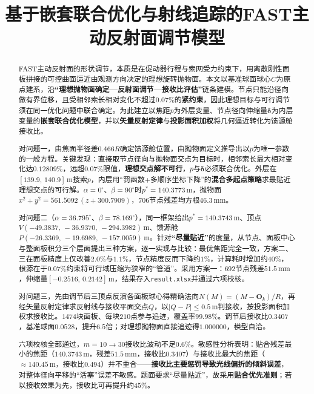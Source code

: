 \documentclass[withoutpreface]{cumcmthesis}
\title{基于嵌套联合优化与射线追踪的FAST主动反射面调节模型}
\begin{document}
\maketitle

\begin{abstract}
FAST主动反射面的形状调节，本质是在促动器行程与索网受力约束下，用离散刚性面板拼接的可控曲面逼近由观测方向决定的理想旋转抛物面。本文以基准球面球心$C$为原点建系，沿\textbf{``理想抛物面确定—反射面调节—接收比评估''}链条建模。节点只能沿径向做有界位移，且受相邻索长相对变化不超过$0.07\%$的\textbf{紧约束}，因此理想目标与可行调节须在同一优化问题中联合确定。为此建立以焦距$p$为外层变量、节点径向伸缩量$\boldsymbol{\delta}$为内层变量的\textbf{嵌套联合优化模型}，并以\textbf{矢量反射定律}与\textbf{投影面积加权}将几何逼近转化为馈源舱接收比。

对问题一，由焦面半径差$0.466R$确定馈源舱位置，由抛物面定义推导出以$p$为唯一参数的一般方程。关键发现：直接取节点径向与抛物面交点为目标时，相邻索长最大相对变化达$0.12809\%$，远超$0.07\%$限值，\textbf{理想交点解不可行}，$p$与$\boldsymbol{\delta}$必须联合优化。外层在$[139.9,\,140.9]\,\mathrm{m}$搜索$p$，内层用``罚函数+多顺序坐标下降''的\textbf{混合多起点策略}求最贴近理想交点的可行解。$\alpha=0^{\circ}$、$\beta=90^{\circ}$时$p^{*}=140.3773\,\mathrm{m}$，抛物面$x^{2}+y^{2}=561.5092\,(z+300.7909)$，$706$节点残差均方根$46.3\,\mathrm{mm}$。

对问题二（$\alpha=36.795^{\circ}$、$\beta=78.169^{\circ}$），同一框架给出$p^{*}=140.3743\,\mathrm{m}$、顶点$V(-49.3837,\,-36.9370,\,-294.3982)\,\mathrm{m}$、馈源舱$P(-26.3369,\,-19.6989,\,-157.0059)\,\mathrm{m}$。针对\textbf{``尽量贴近''}的度量，从节点、面板中心与整面板积分三个层面提出三种方案，逐一实现与比较：最优焦距完全一致，方案二、三在面板精度上仅改善$2.0\%$与$1.1\%$，节点精度反而下降约$1\%$，计算耗时增加约$40\%$，根源在于$0.07\%$约束将可行域压缩为狭窄的``管道''。采用方案一：$692$节点残差$51.5\,\mathrm{mm}$，伸缩量$[-0.2516,\,0.2142]\,\mathrm{m}$，结果存入\texttt{result.xlsx}并通过六项校核。

对问题三，先由调节后三顶点反演各面板球心得精确法向$N(M)=(M-\mathbf{O}_k)/R$，再经矢量反射定律求反射线与接收平面交点$Q$，以$|Q-P|\le0.5\,\mathrm{m}$判接收，按投影面积加权求接收比。$1474$块面板、每块$210$点参与追迹，覆盖率$99.98\%$。调节后接收比$0.3407$，基准球面$0.0528$，提升$6.5$倍；对理想抛物面直接追迹得$1.000000$，模型自洽。

六项校核全部通过，$m=10\to30$接收比波动不足$0.6\%$。敏感性分析表明：贴合残差最小的焦距（$140.3743\,\mathrm{m}$，残差$51.5\,\mathrm{mm}$，接收比$0.3407$）与接收比最大的焦距（$\approx140.45\,\mathrm{m}$，接收比$0.494$）并不重合——\textbf{接收比主要惩罚导致光线偏折的倾斜误差}，对整体径向平移的``活塞''误差不敏感。题面要求``尽量贴近''，故采用\textbf{贴合优先准则}；若以接收效果为先，接收比可再提升约$45\%$。

\end{abstract}
\end{document}
